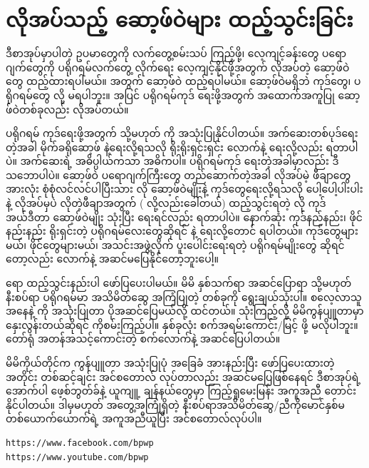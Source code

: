\chapter{လိုအပ်သည့် ဆော့ဖ်ဝဲများ ထည့်သွင်းခြင်း} \label{apdx1}

ဒီစာအုပ်မှာပါတဲ့ ဥပမာတွေကို လက်တွေ့စမ်းသပ်  ကြည့်ဖို့၊ လေ့ကျင့်ခန်းတွေ ပရောဂျက်တွေကို ပရိုဂရမ်လက်တွေ့ လိုက်ရေး လေ့ကျင့်နိုင်ဖို့အတွက် လိုအပ်တဲ့ ဆော့ဖ်ဝဲတွေ ထည့်ထားရပါမယ်။  အတွက်  ဆော့ဖ်ဝဲ ထည့်ရပါမယ်။  ဆော့ဖ်ဝဲမရှိဘဲ  ကုဒ်တွေ၊  ပရိုဂရမ်တွေ  လို့ မရပါဘူး။   အပြင် ပရိုဂရမ်ကုဒ် ရေးဖို့အတွက် အထောက်အကူပြု ဆော့ဖ်ဝဲတစ်ခုလည်း လိုအပ်တယ်။

ပရိုဂရမ် ကုဒ်ရေးဖို့အတွက်  သို့မဟုတ်  ကို အသုံးပြုနိုင်ပါတယ်။ အက်ဆေးတစ်ပုဒ်ရေးတဲ့အခါ မိုက်ခရိုဆော့ဖ်  နဲ့ရေးလို့ရသလို ရိုးရိုးရှင်းရှင်း   လောက်နဲ့ ရေးလို့လည်း ရတာပါပဲ။ အက်ဆေးရဲ့ အဓိပ္ပါယ်ကသာ အဓိကပါ။ ပရိုဂရမ်ကုဒ် ရေးတဲ့အခါမှာလည်း ဒီသဘောပါပဲ။ ဆော့ဖ်ဝဲ ပရောဂျက်ကြီးတွေ တည်ဆောက်တဲ့အခါ လိုအပ်မဲ့ ဖီချာတွေအားလုံး စုံစုံလင်လင်ပါပြီးသား  လို  ဆော့ဖ်ဝဲမျိုးနဲ့ ကုဒ်တွေရေးလို့ရသလို  ပေါ့ပေါ့ပါးပါးနဲ့ လိုအပ်မှပဲ လိုတဲ့ဖီချာအတွက်  ( လို့လည်းခေါ်တယ်) ထည့်သွင်းရတဲ့  လို ကုဒ်အယ်ဒီတာ  ဆော့ဖ်ဝဲမျိုး သုံးပြီး ရေးရင်လည်း ရတာပါပဲ။ နောက်ဆုံး ကုဒ်နည်နည်း၊ ဖိုင်နည်းနည်း ရိုးရှင်းတဲ့ ပရိုဂရမ်လေးတွေဆိုရင်  နဲ့ ရေးလို့တောင် ရပါတယ်။ ကုဒ်တွေများမယ်၊ ဖိုင်တွေများမယ်၊ အသင်းအဖွဲ့လိုက် ပူးပေါင်းရေးရတဲ့ ပရိုဂရမ်မျိုးတွေ ဆိုရင်တော့လည်း  လောက်နဲ့ အဆင်မပြေနိုင်တော့ဘူးပေါ့။ 

 ရော   ထည့်သွင်းနည်းပါ ဖော်ပြပေးပါမယ်။ မိမိ နှစ်သက်ရာ အဆင်ပြောရာ သို့မဟုတ် နီးစပ်ရာ ပရိုဂရမ်မာ အသိမိတ်ဆွေ အကြံပြုတဲ့  တစ်ခုကို ရွေးချယ်သုံးပါ။ စလေ့လာသူအနေနဲ့  ကို အသုံးပြုတာ ပိုအဆင်ပြေမယ်လို့ ထင်တယ်။  သုံးကြည့်လို့ မိမိကွန်ပျူတာမှာ နှေးလွန်းတယ်ဆိုရင်  ကိုစမ်းကြည့်ပါ။ နှစ်ခုလုံး စက်အရမ်းကောင်း/မြင့် ဖို့ မလိုပါဘူး။ တော်ရုံ အတန်အသင့်ကောင်းတဲ့ စက်လောက်နဲ့ အဆင်ပြေပါတယ်။

မိမိကိုယ်တိုင်က ကွန်ပျူတာ အသုံးပြုပုံ အခြေခံ အားနည်းပြီး ဖော်ပြပေးထားတဲ့ အတိုင်း တစ်ဆင့်ချင်း အင်စတောလ် လုပ်တာလည်း အဆင်မပြေဖြစ်နေရင် ဒီစာအုပ်ရဲ့ အောက်ပါ ဖေ့စ်ဘွတ်ခ်နဲ့ ယူကျူ့ ချန်နယ်တွေမှာ ကြည့်ရှုမေးမြန်း အကူအညီ တောင်းနိုင်ပါတယ်။ ဒါမှမဟုတ် အတွေ့အကြုံရှိတဲ့ နီးစပ်ရာအသိမိတ်ဆွေ/ညီကိုမောင်နှစ်မ တစ်ယောက်ယောက်ရဲ့ အကူအညီယူပြီး အင်စတောလ်လုပ်ပါ။
%
\begin{verbatim}
https://www.facebook.com/bpwp
https://www.youtube.com/bpwp
\end{verbatim}
%

